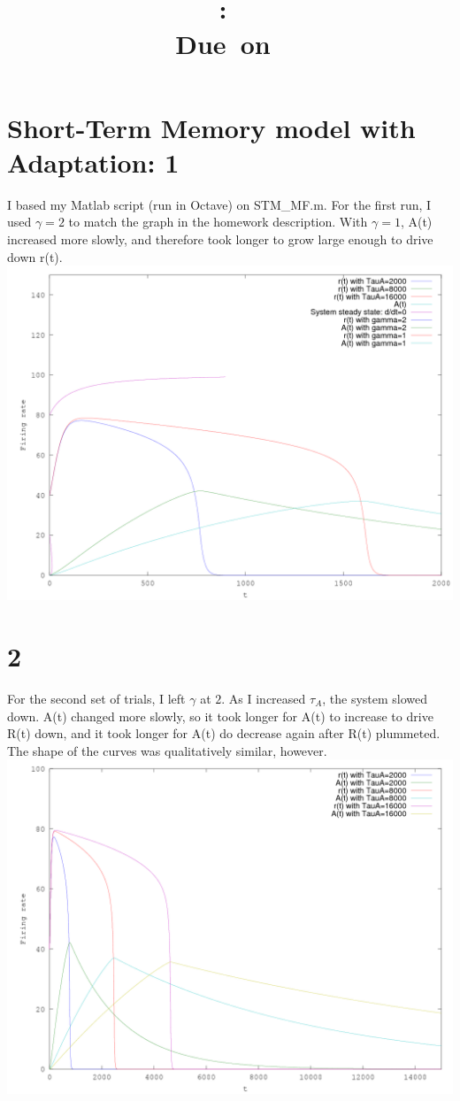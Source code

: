 \documentclass[11pt]{article}
\title{\large{\hmwkAuthorName}\vspace{0.1in}\\\textmd{\textbf{\hmwkClass:\ \hmwkTitle}}\\\normalsize\vspace{0.1in}\small{Due\ on\ \hmwkDueDate}\\\vspace{0.1in}\large{\textit{\hmwkClassInstructor}}\vspace{-0.5in}}
\author{}
\date{}
\begin{document}
\maketitle

\section*{Short-Term Memory model with Adaptation: 1}
I based my Matlab script (run in Octave) on STM\_MF.m.
For the first run, I used $\gamma=2$ to match the graph in the homework description.
With $\gamma=1$, A(t) increased more slowly, and
therefore took longer to grow large enough to drive down r(t).\\
\includegraphics[width=6in]{1.png}\\
\section*{2}
For the second set of trials, I left $\gamma$ at $2$.  As I increased $\tau_A$, the system slowed down.  A(t) changed more slowly, so it took longer for A(t) to increase to drive R(t) down, and it took longer for A(t) do decrease again after R(t) plummeted.  The shape of the curves was qualitatively similar, however.\\
\includegraphics[width=6in]{2.png}\\
\end{document}
